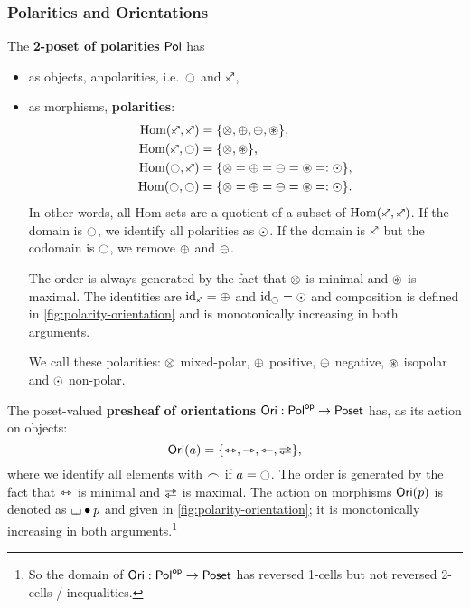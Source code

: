 \documentclass[a4paper]{memoir}
\begin{document}
\subsubsection{Polarities and Orientations}
\begin{definition} \label{def:polarity-cat}
	The \textbf{2-poset of polarities} ${\mathsf{Pol}}$ has
	\begin{itemize}
		\item as objects, anpolarities, i.e.\ $\npolar$ and $\ypolar$,
		\item as morphisms, \textbf{polarities}:
		\begin{align*}
			\Hom(\ypolar, \ypolar) &= \accol{\mixpol, \pospol, \negpol, \isopol}, \\
			\Hom(\ypolar, \npolar) &= \accol{\mixpol, \isopol}, \\
			\Hom(\npolar, \ypolar) &= \accol{\mixpol = \pospol = \negpol = \isopol =: \nonpol}, \\
			\Hom(\npolar, \npolar) &= \accol{\mixpol = \pospol = \negpol = \isopol =: \nonpol}.
		\end{align*}
		In other words, all Hom-sets are a quotient of a subset of $\Hom(\ypolar, \ypolar)$.
		If the domain is $\npolar$, we identify all polarities as ${\odot}$.
		If the domain is $\ypolar$ but the codomain is $\npolar$, we remove ${\oplus}$ and ${\ominus}$.
		
		The order is always generated by the fact that ${\otimes}$ is minimal and ${\oast}$ is maximal.
		The identities are $\id_\ypolar = \pospol$ and $\id_\npolar = \nonpol$ and composition is defined in \cref{fig:polarity-orientation} and is monotonically increasing in both arguments.
		
		We call these polarities: ${\otimes}$ mixed-polar, ${\oplus}$ positive, ${\ominus}$ negative, ${\oast}$ isopolar and ${\odot}$ non-polar.
	\end{itemize}
\end{definition}
\begin{definition} \label{def:orientation-psh}
	The poset-valued \textbf{presheaf of orientations} ${\mathsf{Ori}} : {\mathsf{Pol}}^{\mathsf{op}} \to {\mathsf{Poset}}$ has, as its action on objects:
	\[
		\oripsh(a) = \accol{\equijetsym, \jetsym, \tejsym, \infrajetsym},
	\]
	where we identify all elements with ${\frown}$ if $a = \npolar$.
	The order is generated by the fact that ${\leftrightarrowtriangle}$ is minimal and $\infrajetsym$ is maximal.
	The action on morphisms ${\mathsf{Ori}}(p)$ is denoted as ${\llcorner\hspace{-.4ex}\lrcorner} \mathbin{\bullet} p$ and given in \cref{fig:polarity-orientation}; it is monotonically increasing in both arguments.\footnote{So the domain of ${\mathsf{Ori}} : {\mathsf{Pol}}^{\mathsf{op}} \to {\mathsf{Poset}}$ has reversed 1-cells but not reversed 2-cells / inequalities.}
\end{definition}
\end{document}
